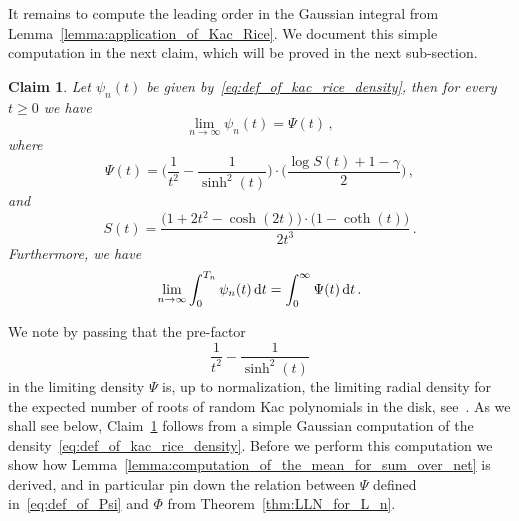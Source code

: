 \documentclass[11pt]{amsart}
\newtheorem{claim}[theorem]{Claim}
\theoremstyle{remark}
\theoremstyle{definition}
\begin{document}
    \noindent
    It remains to compute the leading order in the Gaussian integral from Lemma~\ref{lemma:application_of_Kac_Rice}. We document this simple computation in the next claim, which will be proved in the next sub-section. 
    \begin{claim}
        \label{claim:computing_the_limit_for_gaussian_integral}
        Let $\psi_n(t)$ be given by~\eqref{eq:def_of_kac_rice_density}, then for every $t\ge 0$ we have 
        \[
        \lim_{n\to \infty} \psi_n(t) = \Psi(t) \, ,
        \]
        where
        \begin{equation}
        \label{eq:def_of_Psi}
            \Psi (t) = \Big(\frac{1}{t^2} - \frac{1}{\sinh^2(t)}\Big) \cdot \Big(\frac{\log S(t) + 1-\gamma}{2}\Big) \, ,
        \end{equation}
        and
        \[
        S(t) = \frac{\big(1+2t^2-\cosh(2t)\big)\cdot \big( 1-\coth(t)\big)}{2t^3} \, .
        \]
        Furthermore, we have
        \[
        \lim_{n\to \infty} \int_{0}^{T_n} \psi_n(t) \,  {\rm d}t = \int_{0}^{\infty}\Psi(t) \, {\rm d}t  \, .
        \]
    \end{claim}
    \noindent We note by passing that the pre-factor $$\displaystyle \frac{1}{t^2} - \frac{1}{\sinh^2(t)}$$ in the limiting density $\Psi$ is, up to normalization, the limiting radial density for the expected number of roots of random Kac polynomials in the disk, see~\cite[Theorem~2]{Ibragimov-Zeitouni}. As we shall see below, Claim~\ref{claim:computing_the_limit_for_gaussian_integral} follows from a simple Gaussian computation of the density~\eqref{eq:def_of_kac_rice_density}. Before we perform this computation we show how Lemma~\ref{lemma:computation_of_the_mean_for_sum_over_net} is derived, and in particular pin down the relation between $\Psi$ defined in~\eqref{eq:def_of_Psi} and $\Phi$ from Theorem~\ref{thm:LLN_for_L_n}.
\end{document}

